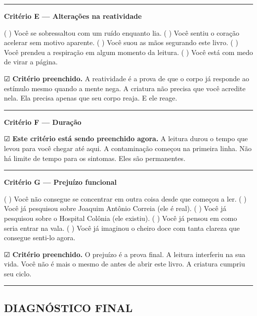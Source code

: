\vspace{0.5em}\noindent\rule{\textwidth}{0.5pt}\vspace{0.5em}

\noindent \textbf{Critério E --- Alterações na reatividade}

\noindent ( ) Você se sobressaltou com um ruído enquanto lia.
( ) Você sentiu o coração acelerar sem motivo aparente.
( ) Você suou as mãos segurando este livro.
( ) Você prendeu a respiração em algum momento da leitura.
( ) Você está com medo de virar a página.

\noindent ☑ \textbf{Critério preenchido.} A reatividade é a prova de que o corpo já responde ao estímulo mesmo quando a mente nega. A criatura não precisa que você acredite nela. Ela precisa apenas que seu corpo reaja. E ele reage.

\vspace{0.5em}\noindent\rule{\textwidth}{0.5pt}\vspace{0.5em}

\noindent \textbf{Critério F --- Duração}

\noindent ☑ \textbf{Este critério está sendo preenchido agora.} A leitura durou o tempo que levou para você chegar até aqui. A contaminação começou na primeira linha. Não há limite de tempo para os sintomas. Eles são permanentes.

\vspace{0.5em}\noindent\rule{\textwidth}{0.5pt}\vspace{0.5em}

\noindent \textbf{Critério G --- Prejuízo funcional}

\noindent ( ) Você não consegue se concentrar em outra coisa desde que começou a ler.
( ) Você já pesquisou sobre Joaquim Antônio Correia (ele é real).
( ) Você já pesquisou sobre o Hospital Colônia (ele existiu).
( ) Você já pensou em como seria entrar na vala.
( ) Você já imaginou o cheiro doce com tanta clareza que consegue senti-lo agora.

\noindent ☑ \textbf{Critério preenchido.} O prejuízo é a prova final. A leitura interferiu na sua vida. Você não é mais o mesmo de antes de abrir este livro. A criatura cumpriu seu ciclo.

\vspace{0.5em}\noindent\rule{\textwidth}{0.5pt}\vspace{0.5em}

\subsection*{DIAGNÓSTICO FINAL}

